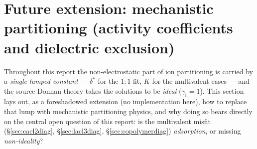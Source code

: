 \documentclass[11pt]{article}
\newcommand{\dstar}{\delta^{*}}
\begin{document}
\section{Future extension: mechanistic partitioning (activity coefficients and dielectric exclusion)}\label{sec:partition}
Throughout this report the non-electrostatic part of ion partitioning is carried
by a \emph{single lumped constant} --- $\dstar$ for the $1{:}1$ fit, $K$ for the
multivalent cases --- and the source Donnan theory \cite{multicompDonnanTheory}
takes the solutions to be \emph{ideal} ($\gamma_i=1$). This section lays out, as a
foreshadowed extension (no implementation here), how to replace that lump with
mechanistic partitioning physics, and why doing so bears directly on the central
open question of this report: is the multivalent misfit
(\S\ref{sec:cacl2diag}, \S\ref{sec:lacl3diag}, \S\ref{sec:copolymerdiag})
\emph{adsorption}, or missing \emph{non-ideality}?
\end{document}
